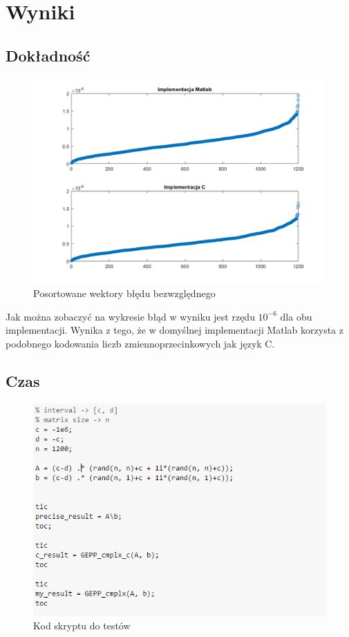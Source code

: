 \documentclass[12pt, flegn, leqno]{article}
\begin{document}
            
    \section{Wyniki}
        \subsection*{Dokładność}
        \begin{figure}[!h]
            \includegraphics[width=\linewidth]{graph.png}
            \caption{Posortowane wektory błędu bezwzględnego}
            \label{fig:graph0}
        \end{figure}
        Jak można zobaczyć na wykresie błąd w wyniku jest rzędu $10^{-6}$ dla obu implementacji.
        Wynika z tego, że w domyślnej implementacji Matlab korzysta z podobnego kodowania 
        liczb zmiennoprzecinkowych jak język C.

        \newpage
        \subsection*{Czas}
        \begin{figure}[!ht]
            \includegraphics[width=\linewidth]{code.png}
            \caption{Kod skryptu do testów}
            \label{fig:code1}
        \end{figure}
\end{document}
